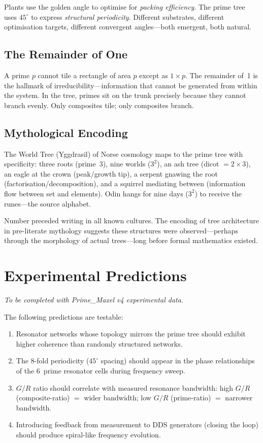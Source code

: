 \documentclass[11pt,a4paper]{article}
\begin{document}
Plants use the golden angle to optimise for \emph{packing efficiency}. The prime tree uses $45^\circ$ to express \emph{structural periodicity}. Different substrates, different optimisation targets, different convergent angles---both emergent, both natural.

\subsection{The Remainder of One}

A prime $p$ cannot tile a rectangle of area $p$ except as $1 \times p$. The remainder of~1 is the hallmark of irreducibility---information that cannot be generated from within the system. In the tree, primes sit on the trunk precisely because they cannot branch evenly. Only composites tile; only composites branch.

\subsection{Mythological Encoding}

The World Tree (Yggdrasil) of Norse cosmology maps to the prime tree with specificity: three roots (prime~3), nine worlds ($3^2$), an ash tree (dicot $= 2\times3$), an eagle at the crown (peak/growth tip), a serpent gnawing the root (factorisation/decomposition), and a squirrel mediating between (information flow between set and elements). Odin hangs for nine days ($3^2$) to receive the runes---the source alphabet.

Number preceded writing in all known cultures. The encoding of tree architecture in pre-literate mythology suggests these structures were observed---perhaps through the morphology of actual trees---long before formal mathematics existed.

\section{Experimental Predictions}

\emph{To be completed with Prime\_Maxel v4 experimental data.}

The following predictions are testable:
\begin{enumerate}[nosep]
    \item Resonator networks whose topology mirrors the prime tree should exhibit higher coherence than randomly structured networks.
    \item The 8-fold periodicity ($45^\circ$ spacing) should appear in the phase relationships of the 6~prime resonator cells during frequency sweep.
    \item $G\!/\!R$ ratio should correlate with measured resonance bandwidth: high $G\!/\!R$ (composite-ratio) $=$ wider bandwidth; low $G\!/\!R$ (prime-ratio) $=$ narrower bandwidth.
    \item Introducing feedback from measurement to DDS generators (closing the loop) should produce spiral-like frequency evolution.
\end{enumerate}
\end{document}
